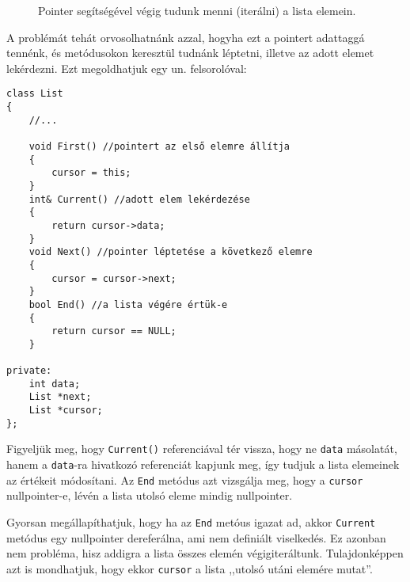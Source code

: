 \documentclass[a4paper,11.5pt,table]{article}
\begin{document}
\begin{figure}[h]
		\bigskip
		\hspace{4mm}
		\smallskip
		
		Pointer segítségével végig tudunk menni (iterálni) a lista elemein.
	\end{figure}
	A problémát tehát orvosolhatnánk azzal, hogyha ezt a pointert adattaggá tennénk, és metódusokon keresztül tudnánk léptetni, illetve az adott elemet lekérdezni. Ezt megoldhatjuk egy un. felsorolóval:
\begin{lstlisting}
class List
{
	//...
	
	void First() //pointert az első elemre állítja
	{
		cursor = this;
	}
	int& Current() //adott elem lekérdezése
	{
		return cursor->data;
	}
	void Next() //pointer léptetése a következő elemre
	{
		cursor = cursor->next;
	}	
	bool End() //a lista végére értük-e
	{
		return cursor == NULL;
	}
	
private:
	int data;
	List *next;
	List *cursor;
};
\end{lstlisting}
	Figyeljük meg, hogy \texttt{Current()} referenciával tér vissza, hogy ne \texttt{data} másolatát, hanem a \texttt{data}-ra hivatkozó referenciát kapjunk meg, így tudjuk a lista elemeinek az értékeit módosítani. Az \texttt{End} metódus azt vizsgálja meg, hogy a \texttt{cursor} nullpointer-e, lévén a lista utolsó eleme mindig nullpointer.
	\begin{note}
		Gyorsan megállapíthatjuk, hogy ha az \texttt{End} metóus igazat ad, akkor \texttt{Current} metódus egy nullpointer dereferálna, ami nem definiált viselkedés. Ez azonban nem probléma, hisz addigra a lista összes elemén végigiteráltunk. Tulajdonképpen azt is mondhatjuk, hogy ekkor \texttt{cursor} a lista ,,utolsó utáni elemére mutat''. 
	\end{note}
\end{document}
